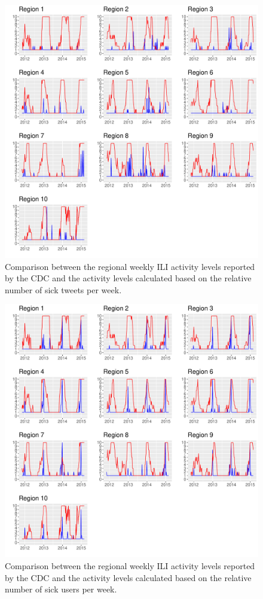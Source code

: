 \documentclass[11pt, a4paper,twoside]{report}\usepackage[]{graphicx}\usepackage[]{color}
\begin{document}
\begin{figure}[H]
\centering
  \includegraphics[width=1\linewidth]{36_cdc_twitter_comp_regs_activity_sick.pdf}
  \caption{Comparison between the regional weekly ILI activity levels reported by the CDC and the activity levels calculated based on the relative number of sick tweets per week.}
    \label{fig:cdc_tw_comp_regs_ac_sick}
\end{figure}

\begin{figure}[H]
\centering
  \includegraphics[width=1\linewidth]{37_cdc_twitter_comp_regs_activity_sick_user.pdf}
  \caption{Comparison between the regional weekly ILI activity levels reported by the CDC and the activity levels calculated based on the relative number of sick users per week.}
    \label{fig:cdc_tw_comp_regs_ac_sick_user}
\end{figure}\newpage
\end{document}
